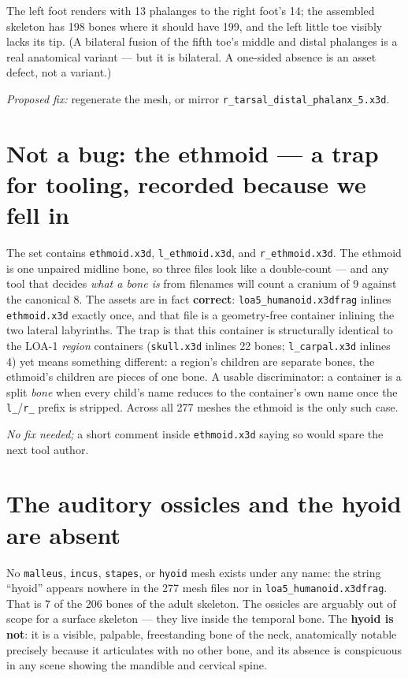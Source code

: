 \documentclass[10pt]{article}
\newcommand{\code}[1]{\texttt{#1}}
\begin{document}
The left foot renders with 13 phalanges to the right foot's 14; the assembled skeleton has
198 bones where it should have 199, and the left little toe visibly lacks its tip. (A
bilateral fusion of the fifth toe's middle and distal phalanges is a real anatomical
variant --- but it is bilateral. A one-sided absence is an asset defect, not a variant.)

\emph{Proposed fix:} regenerate the mesh, or mirror \code{r\_tarsal\_distal\_phalanx\_5.x3d}.

\section{Not a bug: the ethmoid --- a trap for tooling, recorded because we fell in}
The set contains \code{ethmoid.x3d}, \code{l\_ethmoid.x3d}, and \code{r\_ethmoid.x3d}. The
ethmoid is one unpaired midline bone, so three files look like a double-count --- and any
tool that decides \emph{what a bone is} from filenames will count a cranium of 9 against
the canonical 8. The assets are in fact \textbf{correct}: \code{loa5\_humanoid.x3dfrag}
inlines \code{ethmoid.x3d} exactly once, and that file is a geometry-free container
inlining the two lateral labyrinths. The trap is that this container is structurally
identical to the LOA-1 \emph{region} containers (\code{skull.x3d} inlines 22 bones;
\code{l\_carpal.x3d} inlines 4) yet means something different: a region's children are
separate bones, the ethmoid's children are pieces of one bone. A usable discriminator: a
container is a split \emph{bone} when every child's name reduces to the container's own
name once the \code{l\_}/\code{r\_} prefix is stripped. Across all 277 meshes the ethmoid
is the only such case.

\emph{No fix needed;} a short comment inside \code{ethmoid.x3d} saying so would spare the
next tool author.

\section{The auditory ossicles and the hyoid are absent}
No \code{malleus}, \code{incus}, \code{stapes}, or \code{hyoid} mesh exists under any name:
the string ``hyoid'' appears nowhere in the 277 mesh files nor in
\code{loa5\_humanoid.x3dfrag}. That is 7 of the 206 bones of the adult skeleton. The
ossicles are arguably out of scope for a surface skeleton --- they live inside the temporal
bone. The \textbf{hyoid is not}: it is a visible, palpable, freestanding bone of the neck,
anatomically notable precisely because it articulates with no other bone, and its absence
is conspicuous in any scene showing the mandible and cervical spine.
\end{document}
